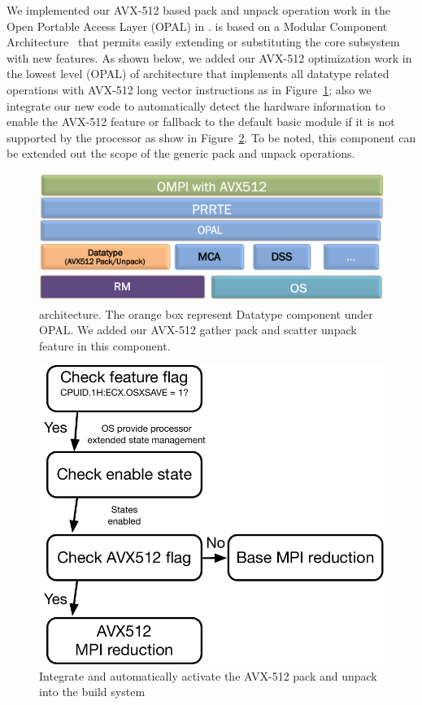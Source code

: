 \documentclass[conference]{IEEEtran}
\begin{document}
We implemented our AVX-512 based pack and unpack operation work in the Open Portable Access Layer (OPAL) in \ompi. \ompi is based on a Modular Component Architecture~\cite{dong_prrte,gabriel04ompi} that permits easily extending or substituting the core subsystem with new features.
As shown below, we added our AVX-512 optimization work in the lowest level (OPAL) of \ompi architecture that implements all datatype related operations with AVX-512 long vector instructions as in Figure~\ref{fig:avx_mca}; also we integrate our new code to automatically detect the hardware information to enable the AVX-512 feature or fallback to the default basic module if it is not supported by the processor as show in Figure~\ref{fig:512flow}. To be noted, this component can be extended out the scope of the generic pack and unpack operations.

\begin{figure}[h]
    \centering
    \includegraphics[width=\linewidth]{ompi-mca.png}
    \caption{\ompi architecture. The orange box represent Datatype component under OPAL. We added our AVX-512 gather pack and scatter unpack feature in this component.}
    \label{fig:avx_mca}
\end{figure}

\begin{figure}[h]
    \centering
    \includegraphics[scale=.45]{512-flow.pdf}
    \caption{Integrate and automatically activate the AVX-512 pack and unpack into the \ompi build system}
    \label{fig:512flow}
\end{figure}
\end{document}
